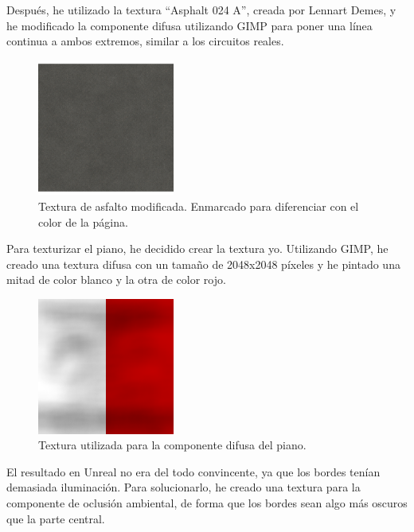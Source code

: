 Después, he utilizado la textura ``Asphalt 024 A''\cite{asphalt}, creada por Lennart Demes, y he modificado la componente difusa utilizando GIMP para poner una línea continua a ambos extremos, similar a los circuitos reales.

\begin{figure}[H]
    \centering
    \includegraphics[width=0.4\textwidth,cframe=black 0.5pt 0pt]{imagenes/pista/Asphalt024A_2K_Color.png}
    \caption{Textura de asfalto modificada. Enmarcado para diferenciar con el color de la página.}
    \label{fig:asfaltomod}
\end{figure}

Para texturizar el piano, he decidido crear la textura yo. Utilizando GIMP, he creado una textura difusa con un tamaño de 2048x2048 píxeles y he pintado una mitad de color blanco y la otra de color rojo. 


\begin{figure}[H]
    \centering
    \includegraphics[width=0.4\textwidth]{imagenes/pista/kerb-dirty2.png}
    \caption{Textura utilizada para la componente difusa del piano.}
    \label{fig:pianodiff}
\end{figure}

El resultado en Unreal no era del todo convincente, ya que los bordes tenían demasiada iluminación. Para solucionarlo, he creado una textura para la componente de oclusión ambiental, de forma que los bordes sean algo más oscuros que la parte central. 

